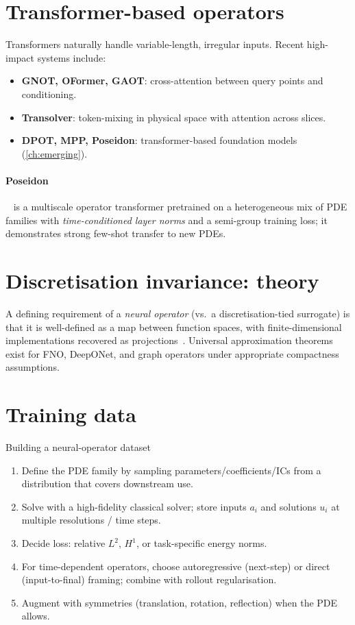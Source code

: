 \section{Transformer-based operators}
Transformers naturally handle variable-length, irregular inputs. Recent
high-impact systems include:
\begin{itemize}
\item \textbf{GNOT, OFormer, GAOT}: cross-attention between query
points and conditioning.
\item \textbf{Transolver}: token-mixing in physical space with attention
across slices.
\item \textbf{DPOT, MPP, Poseidon}: transformer-based foundation models
(\cref{ch:emerging}).
\end{itemize}

\paragraph{Poseidon}~\cite{herde2024poseidon} is a multiscale operator
transformer pretrained on a heterogeneous mix of PDE families with
\emph{time-conditioned layer norms} and a semi-group training loss; it
demonstrates strong few-shot transfer to new PDEs.

\section{Discretisation invariance: theory}
A defining requirement of a \emph{neural operator} (vs.\ a
discretisation-tied surrogate) is that it is well-defined as a map
between function spaces, with finite-dimensional implementations
recovered as projections~\cite{kovachki2023neural}. Universal
approximation theorems exist for FNO, DeepONet, and graph operators
under appropriate compactness assumptions.

\section{Training data}
\begin{recipe}{Building a neural-operator dataset}
\begin{enumerate}
\item Define the PDE family by sampling parameters/coefficients/ICs from
a distribution that covers downstream use.
\item Solve with a high-fidelity classical solver; store inputs $a_i$
and solutions $u_i$ at multiple resolutions / time steps.
\item Decide loss: relative $L^2$, $H^1$, or task-specific energy norms.
\item For time-dependent operators, choose autoregressive (next-step) or
direct (input-to-final) framing; combine with rollout regularisation.
\item Augment with symmetries (translation, rotation, reflection) when
the PDE allows.
\end{enumerate}
\end{recipe}

